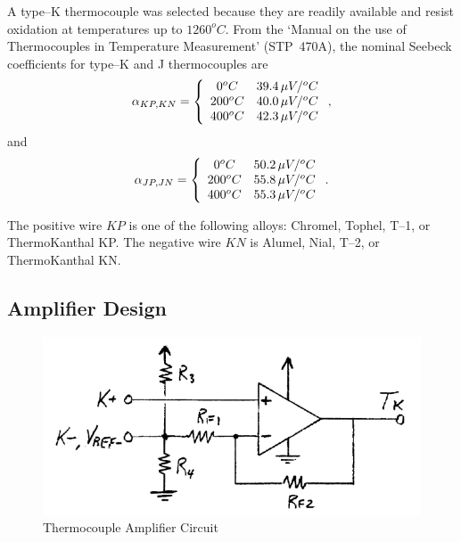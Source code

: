 \documentclass[10pt, twocolumn]{article}
\begin{document}
A type--K thermocouple was selected because they are readily available and
resist oxidation at temperatures up to $1260^{o}C$.
From the `Manual on the use of Thermocouples in Temperature Measurement' \mbox{(STP 470A)}, the nominal
Seebeck coefficients for type--K and J thermocouples are
\begin{equation}
\alpha_{KP,KN}=\left\{\begin{array}{c c}
0^{o}C		&39.4\,\mu V/^{o}C	\\
200^{o}C	&40.0\,\mu V/^{o}C	\\
400^{o}C	&42.3\,\mu V/^{o}C	\\
\end{array}\right.,
\end{equation}
and
\begin{equation}
\alpha_{JP,JN}=\left\{\begin{array}{c c}
0^{o}C		&50.2\,\mu V/^{o}C	\\
200^{o}C	&55.8\,\mu V/^{o}C	\\
400^{o}C	&55.3\,\mu V/^{o}C	\\
\end{array}\right..
\end{equation}

The positive wire $KP$ is one of the following alloys: Chromel, Tophel, T--1, or ThermoKanthal KP.
The negative wire $KN$ is Alumel, Nial, T--2, or ThermoKanthal KN.

\subsection{Amplifier Design}

\begin{figure}
	\centering
	\includegraphics[width=\columnwidth]{Figures/thermocouple-amplifier.pdf}
	\caption{Thermocouple Amplifier Circuit}
	\label{thermocouple-amplifier}
\end{figure}
\end{document}

